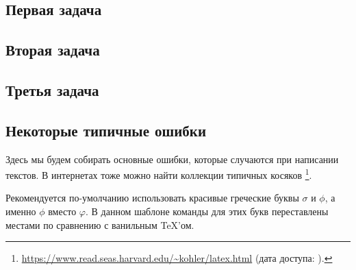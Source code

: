 \subsection{Первая задача}
\label{subsec:task1}

\subsection{Вторая задача}
\label{subsec:task2}

\subsection{Третья задача}
\label{subsec:task3}

\subsection{Некоторые типичные ошибки}
Здесь мы будем собирать основные ошибки, которые случаются при написании текстов.
В интернетах тоже можно найти коллекции типич\-ных косяков%
\footnote{\href{https://www.read.seas.harvard.edu/~kohler/latex.html}{https://www.read.seas.harvard.edu/\textasciitilde kohler/latex.html} (дата доступа: ).}.

Рекомендуется по-умол\-ча\-нию использовать красивые греческие бук\-вы $\sigma$  и $\phi$, а именно $\phi$ вместо $\varphi$.
В данном шаблоне команды для этих букв переставлены местами по сравнению с ванильным \TeX'ом.


